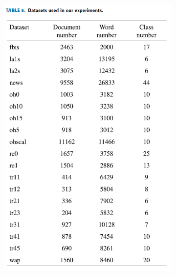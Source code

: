 \documentclass[12pt, a4paper]{article}
\begin{document}
\begin{figure}
    \begin{subfigure}{0.45\linewidth}
        \includegraphics[width=\linewidth]{images/article3/table5.png}
        \caption{}
        \label{a3_table5}
    \end{subfigure}
    \hfill
    \begin{subfigure}{0.45\linewidth}

\end{subfigure}
\end{figure}
\end{document}
